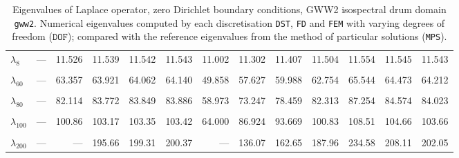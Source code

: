\begin{table}[htbp]
{{\begin{tabular}{lrrrrrrrrrrrr}
    $\lambda_{8}$ & --- & 11.526 & 11.539 & 11.542 & 11.543 & 11.002 & 11.302 & 11.407 & 11.504 & 11.554 & 11.545 & 11.543 \\
    & & & & & & & & & & & & \\
    $\lambda_{60}$ & --- & 63.357 & 63.921 & 64.062 & 64.140 & 49.858 & 57.627 & 59.988 & 62.754 & 65.544 & 64.473 & 64.212 \\
    & & & & & & & & & & & & \\
    $\lambda_{80}$ & --- & 82.114 & 83.772 & 83.849 & 83.886 & 58.973 & 73.247 & 78.459 & 82.313 & 87.254 & 84.574 & 84.023 \\
    & & & & & & & & & & & & \\
    $\lambda_{100}$ & --- & 100.86 & 103.17 & 103.35 & 103.42 & 64.000 & 86.924 & 93.669 & 100.83 & 108.51 & 104.66 & 103.66 \\
    & & & & & & & & & & & & \\
    $\lambda_{200}$ & --- & --- & 195.66 & 199.31 & 200.37 & --- & 136.07 & 162.65 & 187.96 & 234.58 & 208.11 & 202.05 \\
    \bottomrule
  \end{tabular}}}
  \caption{Eigenvalues of Laplace operator, zero Dirichlet boundary conditions, GWW2 isospectral drum domain \texttt{gww2}. Numerical eigenvalues computed by each discretisation \texttt{DST}, \texttt{FD} and \texttt{FEM} with varying degrees of freedom ($\mathtt{DOF}$); compared with the reference eigenvalues from the method of particular solutions (\texttt{MPS}).}
  \label{tab:eigenvalues_head_gww2_transposed_extended}
\end{table}
